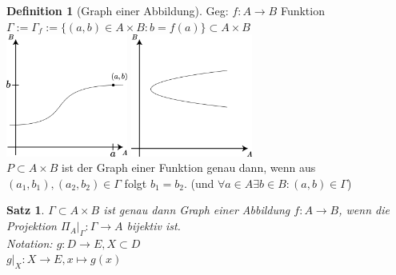 \documentclass[12pt,a4paper,titlepage]{article} %
\newtheorem{satz}{Satz}[subsection]
\theoremstyle{definition}
\newtheorem{defi}{Definition}[subsection]
\theoremstyle{remark}
\begin{document}
\begin{defi}[Graph einer Abbildung]
	Geg: $f: A \rightarrow B$ Funktion\\
	$\Gamma := \Gamma_f := \{(a,b) \in A\times B : b = f(a)\} \subset A\times B$\\
	\includegraphics[width=0.3\textwidth]{images/img05.png}
	\quad
	\includegraphics[width=0.3\textwidth]{images/img06.png}\\
	$P\subset A\times B$ ist der Graph einer Funktion genau dann, wenn aus $(a_1,b_1), (a_2,b_2) \in \Gamma$ folgt $b_1 = b_2$. (und $\forall a\in A \exists b\in B:(a,b)\in\Gamma$)
\end{defi}
\begin{satz}
	$\Gamma \subset A\times B$ ist genau dann Graph einer Abbildung $f: A\rightarrow B$, wenn die Projektion $\Pi_A \vert_\Gamma : \Gamma \rightarrow A$ bijektiv ist.\\
	Notation: $g: D \rightarrow E, X\subset D$\\
	$g\vert_X: X\rightarrow E, x\mapsto g(x)$\\
\end{satz}
\end{document}
